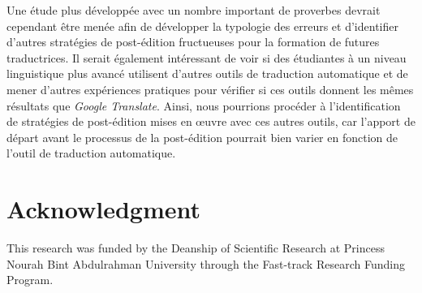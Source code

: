 \documentclass[french]{textolivre}
\begin{document}
Une étude plus développée avec un nombre important de proverbes devrait cependant être menée afin de développer la typologie des erreurs et d’identifier d’autres stratégies de post-édition fructueuses pour la formation de futures traductrices. Il serait également intéressant de voir si des étudiantes à un niveau linguistique plus avancé utilisent d'autres outils de traduction automatique et de mener d’autres expériences pratiques pour vérifier si ces outils donnent les mêmes résultats que \textit{Google Translate}. Ainsi, nous pourrions procéder à l’identification de stratégies de post-édition mises en œuvre avec ces autres outils, car l’apport de départ avant le processus de la post-édition pourrait bien varier en fonction de l’outil de traduction automatique.

\section{Acknowledgment}\label{sec-resumo}
This research was funded by the Deanship of Scientific Research at Princess Nourah Bint Abdulrahman University through the Fast-track Research Funding Program.

\printbibliography\label{sec-bib}
\end{document}
